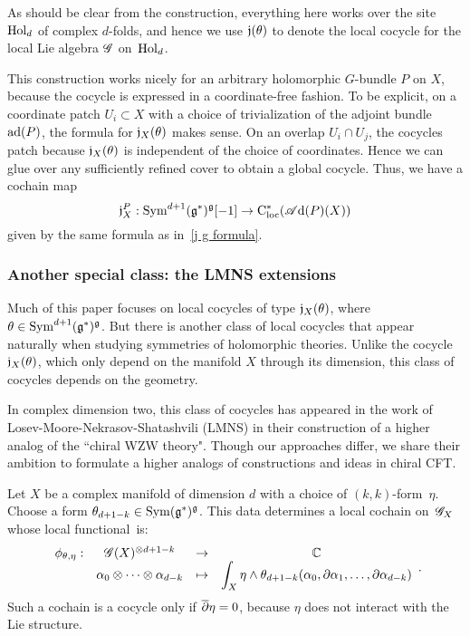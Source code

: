 As should be clear from the construction, everything here works over the site ${\rm Hol}_d$ of complex $d$-folds, and hence we use $\mathfrak j(\theta)$ to denote the local cocycle for the local Lie algebra $\mathscr G$ on~${\rm Hol}_d$.

This construction works nicely for an arbitrary holomorphic $G$-bundle $P$ on $X$,
because the cocycle is expressed in a coordinate-free fashion.
To be explicit, on a coordinate patch $U_i \subset X$ with a choice of trivialization of the adjoint bundle ${\rm ad}(P)$,
the formula for $\mathfrak j_X(\theta)$ makes sense.
On an overlap $U_i \cap U_j$, the cocycles patch because $\mathfrak j_X(\theta)$ is independent of the choice of coordinates.
Hence we can glue over any sufficiently refined cover to obtain a global cocycle. 
Thus, we have a cochain map
\[
\mathfrak j_X^P : {\rm Sym}^{d+1} (\mathfrak g^*)^\mathfrak g [-1] \to {\rm C}_{\rm loc}^*(\mathscr A{\rm d}(P)(X))
\]
given by the same formula as in~\eqref{j g formula}.

\subsubsection{Another special class: the LMNS extensions}
\label{sec: nekext}

Much of this paper focuses on local cocycles of type $\mathfrak j_X(\theta)$, where $\theta \in {\rm Sym}^{d+1}(\mathfrak g^*)^\mathfrak g$.
But there is another class of local cocycles that appear naturally when studying symmetries of holomorphic theories. 
Unlike the cocycle $\mathfrak j_X(\theta)$, which only depend on the manifold $X$ through its dimension, 
this class of cocycles depends on the geometry.

In complex dimension two, this class of cocycles has appeared in the work of Losev-Moore-Nekrasov-Shatashvili (LMNS) \cite{LMNS1,LMNS2,LMNS3} in their construction of a higher analog of the ``chiral WZW theory". 
Though our approaches differ, we share their ambition to formulate a higher analogs of constructions and ideas in chiral CFT. 

Let $X$ be a complex manifold of dimension $d$ with a choice of $(k,k)$-form~$\eta$. 
Choose a form $\theta_{d+1-k} \in {\rm Sym}(\mathfrak g^*)^\mathfrak g$.
This data determines a local cochain on~$\mathscr G_X$ whose local functional~is:
\[
\begin{array}{cccc}
\displaystyle \phi_{\theta, \eta} : & \mathscr G(X)^{\otimes d + 1 - k} & \to & \mathbb C \\
\displaystyle & \alpha_0 \otimes\cdots \otimes \alpha_{d-k} & \mapsto & \displaystyle \int_X \eta \wedge \theta_{d+1-k}(\alpha_0, \partial\alpha_1,\ldots,\partial \alpha_{d-k})
\end{array}.
\]
Such a cochain is a cocycle only if $\overline{\partial} \eta = 0$, because $\eta$ does not interact with the Lie structure.

